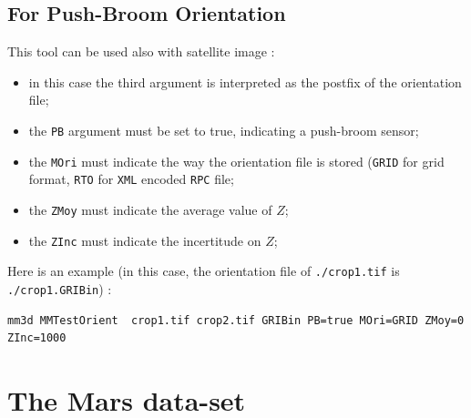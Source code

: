\subsection{For Push-Broom Orientation}
\label{TestOri:PB}

This tool can be used also with satellite image :
\begin{itemize}
  \item in this case the third argument is interpreted as the postfix of the orientation file;
  \item the {\tt PB} argument must be set to true, indicating a push-broom sensor;
  \item the {\tt MOri} must indicate the way the orientation file is stored ({\tt GRID} for grid format,
       {\tt RTO} for  {\tt XML} encoded {\tt RPC} file;
  \item the {\tt ZMoy} must indicate the average value of $Z$;
  \item the {\tt ZInc} must indicate the incertitude on  $Z$;
\end{itemize}

Here is an example (in this case, the orientation file of {\tt ./crop1.tif} is {\tt ./crop1.GRIBin}) :

\begin{verbatim}
mm3d MMTestOrient  crop1.tif crop2.tif GRIBin PB=true MOri=GRID ZMoy=0 ZInc=1000
\end{verbatim}


\section{The Mars data-set}

\label{Mars}



